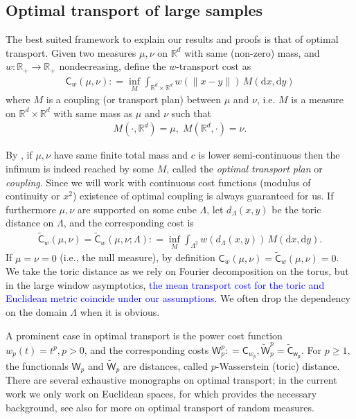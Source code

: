 \documentclass[12pt]{article}
\newcommand{\R}{\mathbb{R}}
\newcommand{\1}{\mathbf{1}}
\newcommand{\md}{\mathrm{d}}
\newcommand{\RL}[1]{\textcolor{blue}{#1}}
\newcommand{\RL}[1]{#1}%
\begin{document}
{{{\subsection{Optimal transport of large samples}
\label{sec:ot_large}

The best suited framework to explain our results and proofs is that of optimal transport. Given two measures $ \mu ,\nu $ on $ \mathbb{R}^{d}$ with same (non-zero) mass, and $ w:\mathbb{R}_{ + }\to \mathbb{R}_{ + }$ nondecreasing, define the $ w$-transport cost as
%
\begin{align*}
  \mathsf C_{w}(\mu ,\nu ) : = \inf _{M}\int_{\mathbb{R}^{d}\times \mathbb{R}^{d}}w(\|x-y\|) \, M(\md x,\md y)
\end{align*}
%
where $ M$ is a coupling ({or transport plan}) between $ \mu $ and $ \nu $, i.e. {$M$ is a measure on $\R^d \times \R^d$ with same mass as $\mu$ and $\nu$ such that  }
%
\begin{align*}M(\cdot ,\mathbb{R}^{d}) = \mu ,\;M(\mathbb{R}^{d},\cdot ) = \nu .
\end{align*}
%
{By  \cite[Theorem 1.7]{santambrogio2015optimal}, if $\mu,\nu$ have same finite total mass and $ c$ is lower semi-continuous   then the infimum is indeed reached by some $ M$, called the  {\it optimal transport plan} or  {{\it coupling}. Since we will work with continuous cost functions (modulus of continuity or $x^2$) existence of optimal coupling is always guaranteed for us.} If furthermore $ \mu ,\nu $ are supported on some cube $ \Lambda $, let $ d_{\Lambda }(x,y)$ be the toric distance on $ \Lambda $, and the corresponding cost is
%
\begin{align}
\label{e:toric_cost}
 {\widetilde {\mathsf C}_{w}(\mu ,\nu)} = \widetilde {\mathsf C}_{w}(\mu ,\nu ;{\Lambda}) : = \inf_{M} \int_{\Lambda ^{2}}w(d_{\Lambda }(x,y)) \, M(\md x,\md y).
\end{align}
%
If $\mu = \nu = 0$ (i.e., the null measure), {by definition} $ \mathsf C_{w}(\mu ,\nu ) = \widetilde {   \mathsf C} _{w}(\mu ,\nu ) = 0$. {We take the toric distance as we rely on Fourier decomposition on the torus, but in the large window asymptotics,
\RL{the mean transport cost for the toric and Euclidean metric coincide under our assumptions.}
 We often drop the dependency on the domain $\Lambda$ when it is obvious.}

A prominent case in optimal transport is the power cost function $ w_{p}(t) = t^{p},p>0$, and the corresponding costs {$\mathsf W_{p}^{p}:  =  \mathsf C_{w_{p}}, \widetilde{\mathsf W}_{p}^{p} =  \mathsf{ \widetilde{C}_{w_p}}  $}. For $ p\geqslant 1,$ the functionals $   \mathsf W_{p}$ and $ \widetilde{   \mathsf W}_{p}$ are distances, called $ p$-Wasserstein (toric) distance. There are several exhaustive monographs on optimal transport; in the current work we only work on Euclidean spaces, for which \cite{santambrogio2015optimal} provides the necessary background, see also \cite{erbar2023optimal} for more on optimal transport of random measures.

}}}}
\end{document}
